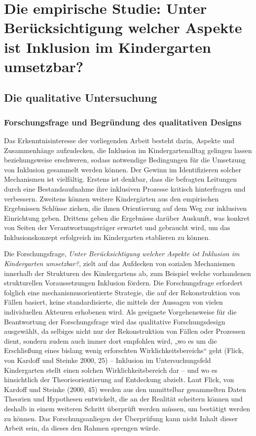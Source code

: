 \part{Die empirische Studie: Unter Berücksichtigung welcher Aspekte ist Inklusion im Kindergarten umsetzbar?}
\chapter{Die qualitative Untersuchung}
\section{Forschungsfrage und Begründung des qualitativen Designs}
Das Erkenntnisinteresse der vorliegenden Arbeit besteht darin, Aspekte und Zusammenhänge aufzudecken, die Inklusion im Kindergartenalltag gelingen lassen beziehungsweise erschweren, sodass notwendige Bedingungen für die Umsetzung von Inklusion gesammelt werden können. Der Gewinn im Identifizieren solcher Mechanismen ist vielfältig. Erstens ist denkbar, dass die befragten Leitungen durch eine Bestandsaufnahme ihre inklusiven Prozesse kritisch hinterfragen und verbessern. Zweitens können weitere Kindergärten aus den empirischen Ergebnissen Schlüsse ziehen, die ihnen Orientierung auf dem Weg zur inklusiven Einrichtung geben. Drittens geben die Ergebnisse darüber Auskunft, was konkret von Seiten der Verantwortungsträger erwartet und gebraucht wird, um das Inklusionskonzept erfolgreich im Kindergarten etablieren zu können.

Die Forschungsfrage, \emph{Unter Berücksichtigung welcher Aspekte ist Inklusion im Kindergarten umsetzbar?}, zielt auf das Aufdecken von sozialen Mechanismen innerhalb der Strukturen des Kindergartens ab, zum Beispiel welche vorhandenen strukturellen Voraussetzungen Inklusion fördern. 
Die Forschungsfrage erfordert folglich eine mechanismusorientierte Strategie, die auf der Rekonstruktion von Fällen basiert, keine  standardisierte, die mittels der Aussagen von vielen individuellen Akteuren erhobenen wird. Als geeignete Vorgehensweise für die Beantwortung der Forschungsfrage wird das  
qualitative Forschungsdesign ausgewählt, da selbiges nicht nur der Rekonstruktion von Fällen oder Prozessen dient, sondern zudem auch immer dort empfohlen wird, „wo es um die Erschließung eines bislang wenig erforschten Wirklichkeitsbereichs“ geht (Flick, von Kardoff und Steinke 2000, 25) -- Inklusion im Untersuchungsfeld Kindergarten stellt einen solchen Wirklichkeitsbereich dar -- und wo es hinsichtlich der Theorieorientierung auf Entdeckung abzielt.
Laut Flick, von Kardoff und Steinke (2000, 45) werden aus den unmittelbar gesammelten Daten Theorien und Hypothesen entwickelt, die  an der Realität scheitern können und deshalb in einem weiteren Schritt überprüft werden müssen, um bestätigt werden zu können. Das Forschungsanliegen der Überprüfung kann nicht Inhalt dieser Arbeit sein, da dieses den Rahmen sprengen würde.  

